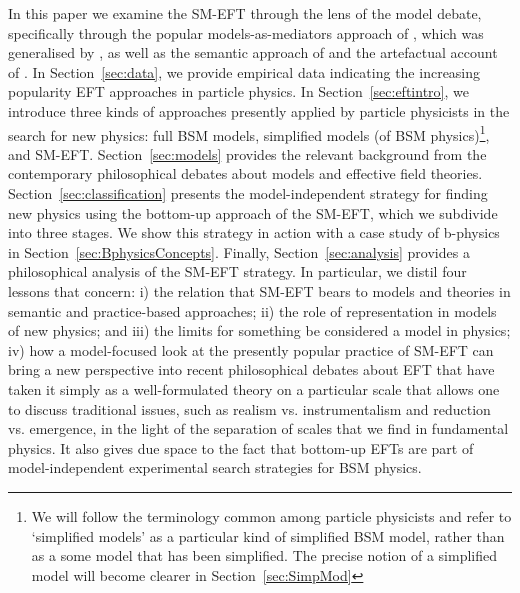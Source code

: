 In this paper we examine the SM-EFT through the lens of the model debate, specifically through the popular models-as-mediators approach of \citet{morganmorrison}, which was generalised by \citet{mccoymassimi}, as well as the semantic approach of \citet{hartmann1999} and the artefactual account of \citet{knuuttila2011}. 
In Section~\ref{sec:data}, we provide empirical data indicating the increasing popularity EFT approaches in particle physics. 
In Section~\ref{sec:eftintro}, we introduce three kinds of approaches presently applied by particle physicists in the search for new physics: full BSM models, simplified models (of BSM physics)\footnote{We will follow the terminology common among particle physicists and refer to ‘simplified models’ as a particular kind of simplified BSM model, rather than as a some model that has been simplified. The precise notion of a simplified model will become clearer in Section~\ref{sec:SimpMod}}, and SM-EFT. 
Section~\ref{sec:models} provides the relevant background from the contemporary philosophical debates about models and effective field theories. 
Section~\ref{sec:classification} presents the model-independent strategy for finding new physics using the bottom-up approach of the SM-EFT, which we subdivide into three stages.
We show this strategy in action with a case study of b-physics in Section~\ref{sec:BphysicsConcepts}. 
Finally, Section~\ref{sec:analysis} provides a philosophical analysis of the SM-EFT strategy.  
In particular, we distil four lessons that concern: i) the relation that SM-EFT bears to models and theories in semantic and practice-based approaches; ii) the role of representation in models of new physics; and iii) the limits for something be considered a model in physics; iv) how a model-focused look at the presently popular practice of SM-EFT can bring a new perspective into recent philosophical debates about EFT that have taken it simply as a well-formulated theory on a particular scale that allows one to discuss traditional issues, such as realism vs. instrumentalism and reduction vs. emergence, in the light of the separation of scales that we find in fundamental physics. It also gives due space to the fact that bottom-up EFTs are part of model-independent experimental search strategies for BSM physics.

